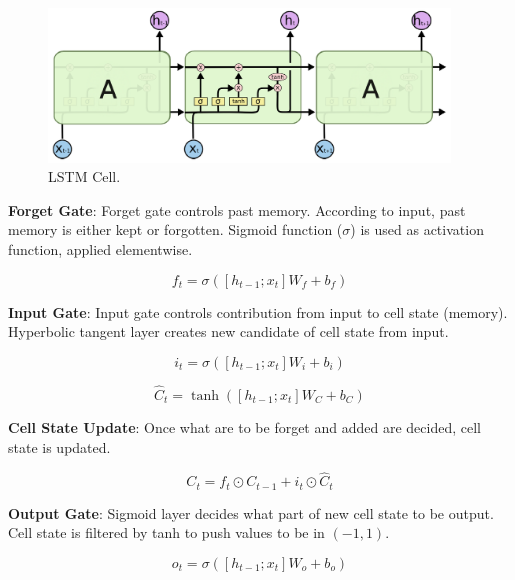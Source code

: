 \begin{figure}
	\centering
	\includegraphics[width=0.95\textwidth]{figures/ml_theory/lstm/lstm_module.png}
	\caption{LSTM Cell.}
	\label{fig:lstm_cell}
\end{figure}

\textbf{Forget Gate}: Forget gate controls past memory. According to input, past memory is either kept or forgotten. Sigmoid function ($\sigma$) is used as activation function, applied elementwise.

\begin{equation}
\label{eqn:lstm_forget}
f_t = \sigma( [h_{t-1}; x_t] W_f + b_f) 
\end{equation}

\textbf{Input Gate}: Input gate controls contribution from input to cell state (memory). Hyperbolic tangent layer creates new candidate of cell state from input.

\begin{equation}
\label{eqn:lstm_inp}
i_t = \sigma( [h_{t-1}; x_t] W_i + b_{i}) 
\end{equation}

\begin{equation}
\label{eqn:lstm_cellstcand}
\hat{C}_t = \tanh( [h_{t-1}; x_t] W_C + b_C) 
\end{equation}

\textbf{Cell State Update}: Once what are to be forget and added are decided, cell state is updated.

\begin{equation}
\label{eqn:lstm_cellstupt}
C_t = f_t \odot C_{t-1} + i_t \odot \hat{C}_t
\end{equation}


\textbf{Output Gate}: Sigmoid layer decides what part of new cell state to be output. Cell state is filtered by tanh to push values to be in $(-1,1)$.

\begin{equation}
\label{eqn:lstm_out}
o_t = \sigma( [h_{t-1}; x_t] W_o + b_o) 
\end{equation}


